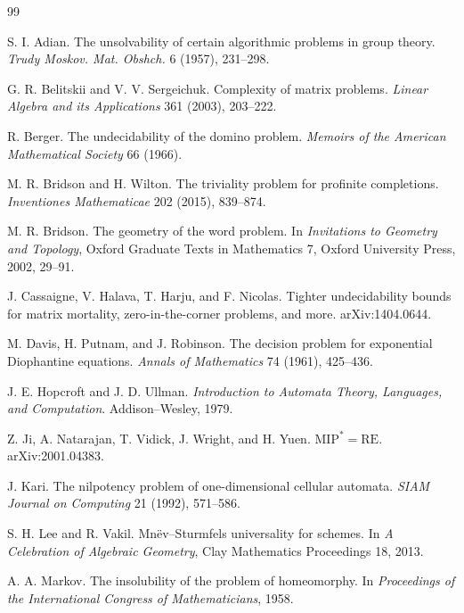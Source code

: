 \documentclass[11pt]{article}
\begin{document}
\begin{thebibliography}{99}

S. I. Adian.
\newblock The unsolvability of certain algorithmic problems in group theory.
\newblock \emph{Trudy Moskov. Mat. Obshch.} 6 (1957), 231--298.

G. R. Belitskii and V. V. Sergeichuk.
\newblock Complexity of matrix problems.
\newblock \emph{Linear Algebra and its Applications} 361 (2003), 203--222.

R. Berger.
\newblock The undecidability of the domino problem.
\newblock \emph{Memoirs of the American Mathematical Society} 66 (1966).

M. R. Bridson and H. Wilton.
\newblock The triviality problem for profinite completions.
\newblock \emph{Inventiones Mathematicae} 202 (2015), 839--874.

M. R. Bridson.
\newblock The geometry of the word problem.
\newblock In \emph{Invitations to Geometry and Topology}, Oxford Graduate Texts in Mathematics 7, Oxford University Press, 2002, 29--91.

J. Cassaigne, V. Halava, T. Harju, and F. Nicolas.
\newblock Tighter undecidability bounds for matrix mortality, zero-in-the-corner problems, and more.
\newblock arXiv:1404.0644.

M. Davis, H. Putnam, and J. Robinson.
\newblock The decision problem for exponential Diophantine equations.
\newblock \emph{Annals of Mathematics} 74 (1961), 425--436.

J. E. Hopcroft and J. D. Ullman.
\newblock \emph{Introduction to Automata Theory, Languages, and Computation}.
\newblock Addison--Wesley, 1979.

Z. Ji, A. Natarajan, T. Vidick, J. Wright, and H. Yuen.
\newblock \( \mathrm{MIP}^{\ast}=\mathrm{RE}\).
\newblock arXiv:2001.04383.

J. Kari.
\newblock The nilpotency problem of one-dimensional cellular automata.
\newblock \emph{SIAM Journal on Computing} 21 (1992), 571--586.

S. H. Lee and R. Vakil.
\newblock Mnëv--Sturmfels universality for schemes.
\newblock In \emph{A Celebration of Algebraic Geometry}, Clay Mathematics Proceedings 18, 2013.

A. A. Markov.
\newblock The insolubility of the problem of homeomorphy.
\newblock In \emph{Proceedings of the International Congress of Mathematicians}, 1958.


\end{thebibliography}
\end{document}
